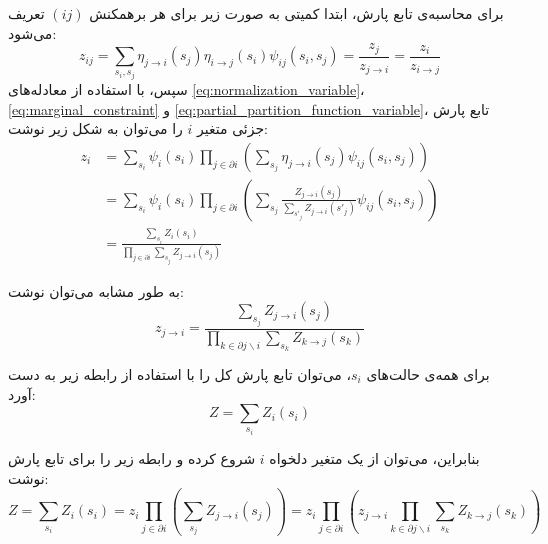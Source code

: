 \begin{appendices}
    برای محاسبه‌ی تابع پارش، ابتدا کمیتی به صورت زیر برای هر برهمکنش
    \( (ij) \)
    تعریف می‌شود:
    \begin{equation} \label{eq:z_constraint}
        z_{ij} = \sum_{s_{i},s_{j}} \eta_{j \to i}(s_{j}) \eta_{i \to j}(s_{i}) \psi_{ij}(s_{i}, s_{j}) = \frac{z_{j}}{z_{j \to i}} = \frac{z_{i}}{z_{i \to j}}
    \end{equation}
    سپس، با استفاده از معادله‌های
    \ref{eq:normalization_variable}، \ref{eq:marginal_constraint} و \ref{eq:partial_partition_function_variable}،
    تابع پارش جزئی متغیر
    \( i \)
    را می‌توان به شکل زیر نوشت:
    \begin{equation}
        \begin{split}
            z_{i} & = \sum_{s_{i}} \psi_{i}(s_{i}) \prod_{j \in \partial i} \left( \sum_{s_{j}} \eta_{j \to i} (s_{j}) \psi_{ij}(s_{i},s_{j}) \right)                                       \\
                  & = \sum_{s_{i}} \psi_{i}(s_{i}) \prod_{j \in \partial i} \left( \sum_{s_{j}} \frac{Z_{j \to i}(s_{j})}{\sum_{s'_{j}} Z_{j \to i}(s'_{j})} \psi_{ij}(s_{i},s_{j}) \right) \\
                  & = \frac{\sum_{s_{i}} Z_{i}(s_{i})}{\prod_{j \in \partial i } \sum_{s_{j}} Z_{j \to i}(s_{j})}
        \end{split}
    \end{equation}

    به طور مشابه می‌توان نوشت:
    \begin{equation}
        z_{j \to i} = \frac{\sum_{s_{j}} Z_{j \to i}(s_{j})}{\prod_{k \in \partial j \backslash i} \sum_{s_{k}} Z_{k \to j}(s_{k})}
    \end{equation}

    برای همه‌ی حالت‌های
    \( s_{i} \)،
    می‌توان تابع پارش کل را با استفاده از رابطه زیر به دست آورد:
    \[ Z = \sum_{s_i} Z_i(s_i) \]

    بنابراین، می‌توان از یک متغیر دلخواه
    \( i \)
    شروع کرده و رابطه زیر را برای تابع پارش نوشت:
    \[ Z = \sum_{s_{i}} Z_{i}(s_{i}) = z_{i} \prod_{j \in \partial i} \left( \sum_{s_{j}} Z_{j \to i}(s_{j}) \right) = z_i \prod_{j \in \partial i} \left( z_{j \to i} \prod_{k \in \partial j \backslash i} \sum_{s_{k}} Z_{k \to j}(s_{k}) \right) \]


\end{appendices}
